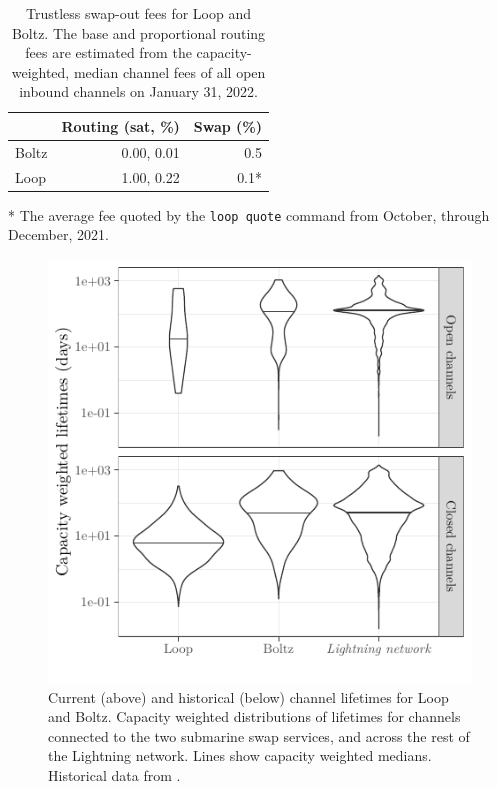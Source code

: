 \documentclass[10pt,twocolumn]{article}
\begin{document}
\begin{table}[tb] \footnotesize
\caption{\label{tbl:trustless}
	Trustless swap-out fees for Loop and Boltz.
	The base and proportional routing fees are estimated from the
	capacity-weighted, median channel fees
	of all open inbound channels on January 31, 2022.
}
\centering
\begin{tabular}{lrr}
\toprule
	&	{Routing (sat, \%)}	&	{Swap (\%)} \\
\midrule
Boltz	&	0.00, 0.01	&	0.5\phantom{*}  \\
Loop	&	1.00, 0.22	&	0.1*	\\
\bottomrule
\end{tabular}
\begin{flushleft}
	* The average fee quoted by the \texttt{loop quote} command
	from October, through December, 2021.
\end{flushleft}
\end{table}

\begin{figure}[tb]
	\includegraphics[width=\columnwidth]{fig/routing/lifetimes}
	\caption[Historical channel lifetimes for Loop and Boltz.]{ \label{lifetimes}
		Current (above) and historical (below) channel lifetimes for Loop and Boltz.
		Capacity weighted distributions of lifetimes for channels connected to
		the two submarine swap services, and across the rest of the Lightning network.
		Lines show capacity weighted medians.
		Historical data from \citet{lnchannels}.
	}
\end{figure}
\end{document}
